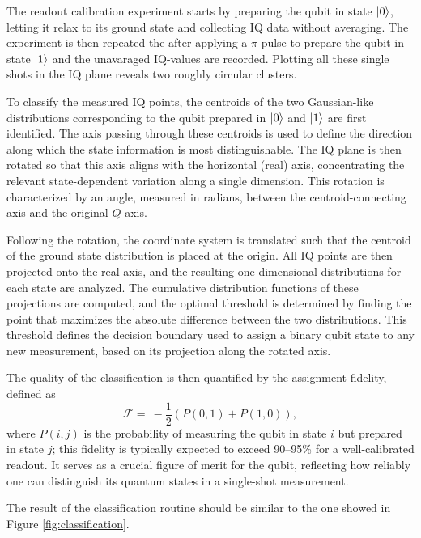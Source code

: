 The readout calibration experiment starts by preparing the qubit in state $\ket{0}$, letting it relax to its ground state and collecting IQ data without averaging.
The experiment is then repeated the after applying a $\pi$-pulse to prepare the qubit in state $\ket{1}$ and the unavaraged IQ-values are recorded.
Plotting all these single shots in the IQ plane reveals two roughly circular clusters. 

To classify the measured IQ points, the centroids of the two Gaussian-like distributions corresponding to the qubit prepared in $\ket{0}$ and $\ket{1}$ are first identified. 
The axis passing through these centroids is used to define the direction along which the state information is most distinguishable. 
The IQ plane is then rotated so that this axis aligns with the horizontal (real) axis, concentrating the relevant state-dependent variation along a single dimension. 
This rotation is characterized by an angle, measured in radians, between the centroid-connecting axis and the original $Q$-axis.

Following the rotation, the coordinate system is translated such that the centroid of the ground state distribution is placed at the origin. 
All IQ points are then projected onto the real axis, and the resulting one-dimensional distributions for each state are analyzed. 
The cumulative distribution functions of these projections are computed, and the optimal threshold is determined by finding the point that maximizes the absolute difference between the two distributions. 
This threshold defines the decision boundary used to assign a binary qubit state to any new measurement, based on its projection along the rotated axis.

The quality of the classification is then quantified by the assignment fidelity, defined as \cite{gao_practical_2021} 
\begin{equation}
    \mathcal{F} = \ -\frac{1}{2}(P(0,1)+P(1,0)),
\end{equation}
where $P(i,j)$ is the probability of measuring the qubit in state $i$ but prepared in state $j$; this fidelity is typically expected to exceed 90–95\% for a well-calibrated readout. 
It serves as a crucial figure of merit for the qubit, reflecting how reliably one can distinguish its quantum states in a single-shot measurement. 

The result of the classification routine should be similar to the one showed in Figure \ref{fig:classification}.

